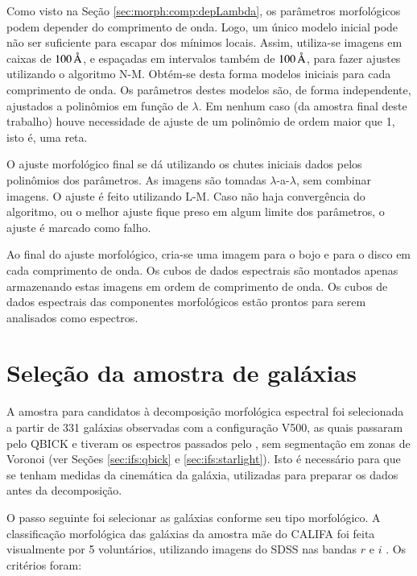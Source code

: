 Como visto na Seção \ref{sec:morph:comp:depLambda}, os parâmetros morfológicos
podem depender do comprimento de onda. Logo, um único modelo inicial pode não
ser suficiente para escapar dos mínimos locais. Assim, utiliza-se imagens em
caixas de $100\,\text{\normalfont\AA}$, e espaçadas em intervalos também de
$100\,\text{\normalfont\AA}$, para fazer ajustes utilizando o algoritmo N-M. Obtém-se desta
forma modelos iniciais para cada comprimento de onda. Os parâmetros destes
modelos são, de forma independente, ajustados a polinômios em função de
$\lambda$. Em nenhum caso (da amostra final deste trabalho) houve necessidade de
ajuste de um polinômio de ordem maior que 1, isto é, uma reta.

O ajuste morfológico final se dá utilizando os chutes iniciais dados pelos
polinômios dos parâmetros. As imagens são tomadas $\lambda$-a-$\lambda$, sem
combinar imagens. O ajuste é feito utilizando L-M. Caso não haja convergência do
algoritmo, ou o melhor ajuste fique preso em algum limite dos parâmetros, o
ajuste é marcado como falho.

Ao final do ajuste morfológico, cria-se uma imagem para o bojo e para o disco em
cada comprimento de onda. Os cubos de dados espectrais são montados apenas
armazenando estas imagens em ordem de comprimento de onda. Os cubos de dados
espectrais das componentes morfológicos estão prontos para serem analisados como
espectros.



\section{Seleção da amostra de galáxias}

A amostra para candidatos à decomposição morfológica espectral foi selecionada a
partir de 331 galáxias observadas com a configuração V500, as quais passaram
pelo QBICK e tiveram os espectros passados pelo \starlight, sem segmentação em
zonas de Voronoi (ver Seções \ref{sec:ifs:qbick} e \ref{sec:ifs:starlight}).
Isto é necessário para que se tenham medidas da cinemática da galáxia,
utilizadas para preparar os dados antes da decomposição.

O passo seguinte foi selecionar as galáxias conforme seu tipo morfológico. A
classificação morfológica das galáxias da amostra mãe do CALIFA foi feita
visualmente por 5 voluntários, utilizando imagens do SDSS nas bandas $r$ e $i$
\citep{Walcher2014}. Os critérios foram:

